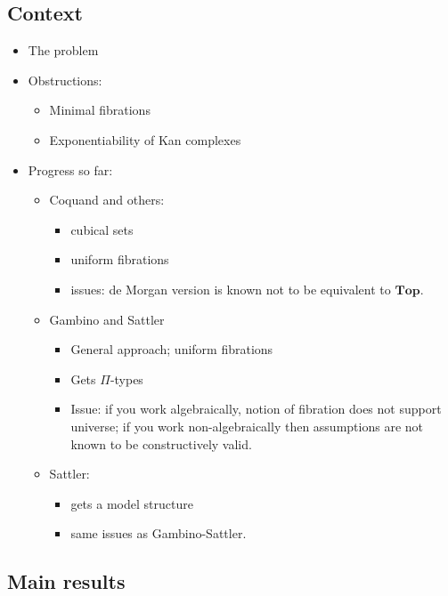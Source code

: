 \documentclass[reqno,10pt,a4paper,oneside,draft]{amsart}
\begin{document}
\subsection*{Context} 
\begin{itemize}
\item The problem
\item Obstructions:
\begin{itemize}
\item Minimal fibrations
\item Exponentiability of Kan complexes
\end{itemize}
\item Progress so far:
\begin{itemize}
\item Coquand and others:  
\begin{itemize}
\item cubical sets
\item uniform fibrations
\item issues: de Morgan version is known not to be equivalent to $\mathbf{Top}$.
\end{itemize}
\item Gambino and Sattler
\begin{itemize}
\item General approach; uniform fibrations
\item Gets $\Pi$-types
\item Issue: if you work algebraically, notion of fibration does not support universe; if you work non-algebraically then assumptions are not known to be constructively valid.
\end{itemize}
\item Sattler: 
\begin{itemize}
\item gets a model structure
\item same issues as Gambino-Sattler. 
\end{itemize}
\end{itemize}
\end{itemize}


\subsection*{Main results}
\end{document}
